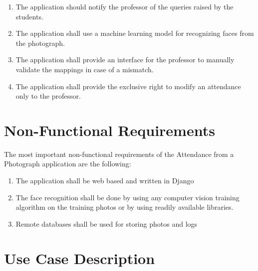 \documentclass[paper=a4, fontsize=15pt]{scrartcl}
\begin{document}
\begin{multicols}{2}
\begin{enumerate}
    \item The application should notify the professor of the queries raised by the students.
    
    \item The application shall use a machine learning model for recognizing faces from the photograph.
    
    \item The application shall provide an interface for the professor to manually validate the mappings in case of a mismatch.
    
    \item The application shall provide the exclusive right to modify an attendance only to the professor.
\end{enumerate}

\end{multicols}
\pagebreak
\section{Non-Functional Requirements}

\begin{multicols}{2}

 The most important non-functional requirements of the Attendance from a Photograph application are the following:
 
 \begin{enumerate}
     \item The application shall be web based and written in Django
     
     \item The face recognition shall be done by using any computer vision training algorithm on the training photos or by using readily available libraries.
     
     \item Remote databases shall be used for storing photos and logs
 \end{enumerate}

\end{multicols}

\section{Use Case Description}
\end{document}
